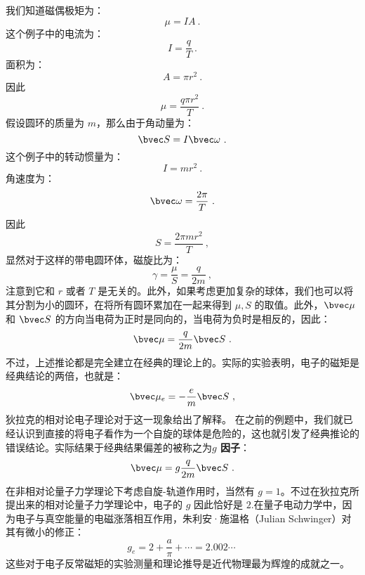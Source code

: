 我们知道磁偶极矩为：
\begin{equation}
\mu = IA~.
\end{equation}
这个例子中的电流为：
\begin{equation}
I=\frac{q}{T}~.
\end{equation}
面积为：
\begin{equation}
A= \pi r^2~.
\end{equation}
因此
\begin{equation}
\mu=\frac{q\pi r^2}{T}~.
\end{equation}
假设圆环的质量为 $m$，那么由于角动量为：
\begin{equation}
\bvec S = I\bvec\omega~.
\end{equation}
这个例子中的转动惯量为：
\begin{equation}
I = mr^2~.
\end{equation}
角速度为：
\begin{equation}
\bvec \omega = \frac{2\pi}{T}~.
\end{equation}
因此
\begin{equation}
S = \frac{2\pi m r^2}{T}~,
\end{equation}
显然对于这样的带电圆环体，磁旋比为：
\begin{equation}
\gamma = \frac{\mu}{S} = \frac{q}{2m}~,
\end{equation}
注意到它和 $r$ 或者 $T$ 是无关的。此外，如果考虑更加复杂的球体，我们也可以将其分割为小的圆环，在将所有圆环累加在一起来得到 $\mu,S$ 的取值。此外，$\bvec \mu$ 和 $\bvec S$ 的方向当电荷为正时是同向的，当电荷为负时是相反的，因此：
\begin{equation}
\bvec \mu = \frac{q}{2m}\bvec S~.
\end{equation}
不过，上述推论都是完全建立在经典的理论上的。实际的实验表明，电子的磁矩是经典结论的两倍，也就是：
\begin{equation}
\bvec \mu_e = -\frac{e}{m}\bvec S~,
\end{equation}
狄拉克的相对论电子理论对于这一现象给出了解释。
在之前的例题中，我们就已经认识到直接的将电子看作为一个自旋的球体是危险的，这也就引发了经典推论的错误结论。实际结果于经典结果偏差的被称之为\textbf{$g$ 因子}：
\begin{equation}\label{eq_HfineS_43}
\bvec \mu = g\frac{q}{2m}\bvec S~.
\end{equation}
在非相对论量子力学理论下考虑自旋-轨道作用时，当然有 $g=1$。不过在狄拉克所提出来的相对论量子力学理论中，电子的 $g$ 因此恰好是 $2$.在量子电动力学中，因为电子与真空能量的电磁涨落相互作用，朱利安·施温格（Julian Schwinger）对其有微小的修正：
\begin{equation}
g_e = 2+\frac{a}{\pi}+\cdots = 2.002\cdots~
\end{equation}
这些对于电子反常磁矩的实验测量和理论推导是近代物理最为辉煌的成就之一。

